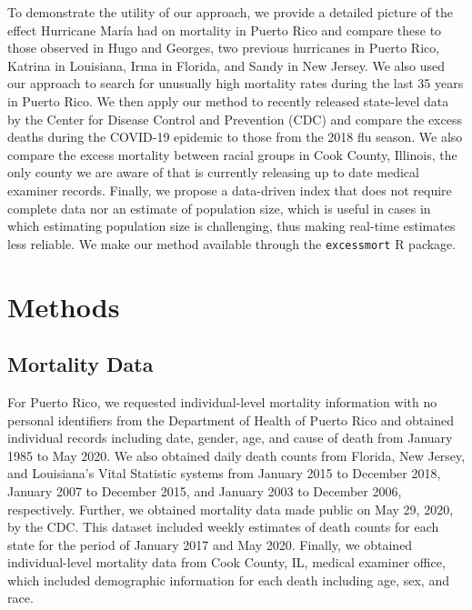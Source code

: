 \documentclass[11pt]{article}
\begin{document}
To demonstrate the utility of our approach, we provide a detailed picture of the effect Hurricane Mar\'ia had on mortality in Puerto Rico and compare these to those observed in Hugo and Georges, two previous hurricanes in Puerto Rico, Katrina in Louisiana, Irma in Florida, and Sandy in New Jersey. We also used our approach to search for unusually high mortality rates during the last 35 years in Puerto Rico. We then apply our method to recently released state-level data by the Center for Disease Control and Prevention (CDC) and compare the excess deaths during the COVID-19 epidemic to those from the 2018 flu season. We also compare the excess mortality between racial groups in Cook County, Illinois, the only county we are aware of that is currently releasing up to date medical examiner records. Finally, we propose a data-driven index that does not require complete data nor an estimate of population size, which is useful in cases in which estimating population size is challenging, thus making real-time estimates less reliable. We make our method available through the \verb+excessmort+ R package.

\section{Methods}
\label{sec:methods}

\subsection{Mortality Data}
\label{subsec:mortality-data}
For Puerto Rico, we requested individual-level mortality information with no personal identifiers from the Department of Health of Puerto Rico and obtained individual records including date, gender, age, and cause of death from January 1985 to May 2020. We also obtained daily death counts from Florida, New Jersey, and Louisiana’s Vital Statistic systems from January 2015 to December 2018, January 2007 to December 2015, and January 2003 to December 2006, respectively. Further, we obtained mortality data made public on May 29, 2020, by the CDC\cite{cdc2020covid19}. This dataset included weekly estimates of death counts for each state for the period of January 2017 and May 2020. Finally, we obtained individual-level mortality data from Cook County, IL, medical examiner office\cite{cookcovid19}, which included demographic information for each death including age, sex, and race.
\end{document}
